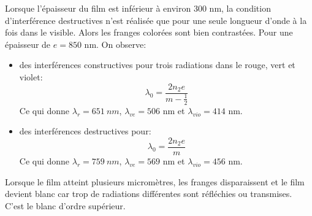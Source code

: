 \documentclass[french]{article}
\begin{document}
Lorsque l'épaisseur du film est inférieur à environ $300$ nm, la condition d'interférence destructives n'est réalisée que pour une seule longueur d'onde à la fois dans le visible. Alors les franges colorées sont bien contrastées. Pour une épaisseur de $e=850$ nm. On observe:

\begin{itemize}
	\item des interférences constructives pour trois radiations dans le rouge, vert et violet: 
\[\lambda_0 = \frac{2n_2e}{m-\frac{1}{2}}\]
Ce qui donne $\lambda_r = 651~nm$, $\lambda_{ve} = 506$ nm et $\lambda_{vio} = 414$ nm.
	\item  des interférences destructives pour: 
\[\lambda_0 = \frac{2n_2 e}{m}\]
Ce qui donne $\lambda_r = 759~nm$, $\lambda_{ve} = 569$ nm et $\lambda_{vio} = 456$ nm.
\end{itemize}

Lorsque le film atteint plusieurs micromètres, les franges disparaissent et le film devient blanc car trop de radiations différentes sont réfléchies ou transmises. C'est le blanc d'ordre supérieur.
\end{document}
